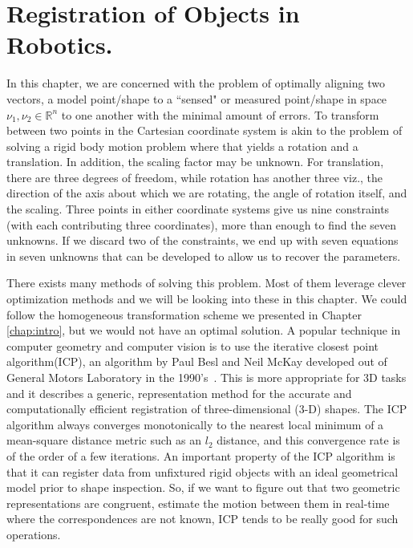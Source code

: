 \chapter{Registration of Objects in Robotics.}  
 \label{chap:opt_rot::intro}
 
 In this chapter, we are concerned with the problem of optimally aligning two vectors, a model point/shape to a ``sensed" or measured point/shape in space \eg $\nu_1, \nu_2 \in \mathbb{R}^n$ to one another with the minimal amount of errors.
 To transform between two points in the Cartesian coordinate system is akin to the problem of solving a rigid body motion problem where that yields a rotation and a translation. In addition, the scaling factor may be unknown. For translation, there are three degrees of freedom, while rotation has another three viz., the direction of the axis about which we are rotating,  the angle of rotation itself, and the scaling. Three points in either coordinate systems give us nine constraints (with each contributing three coordinates), more than enough to find the seven unknowns. If we discard two of the constraints, we end up with seven equations in seven unknowns that can be developed to allow us to recover the parameters.
 
 There exists many methods of solving this problem. Most of them leverage clever optimization methods and we will be looking into these in this chapter. We could follow the homogeneous transformation scheme we presented in Chapter \ref{chap:intro}, but we would not have an optimal solution. A popular technique in computer geometry and computer vision is to use the iterative closest point algorithm(ICP), an algorithm by Paul Besl and Neil McKay developed out of General Motors Laboratory in the 1990's~\cite{besl1992method}. This is more appropriate for 3D tasks and it describes a generic, representation method for the accurate and computationally efficient registration of three-dimensional (3-D) shapes. The ICP algorithm always converges monotonically to the nearest local minimum of a mean-square distance metric such as an $l_2$ distance, and this convergence rate is of the order of a few iterations. An important property of the ICP algorithm is that it can register data from unfixtured rigid objects with an ideal geometrical model prior to shape inspection. So, if we want to figure out that two geometric representations are congruent, estimate the motion between them in real-time where the correspondences are not known, ICP tends to be really good for such operations.
 
